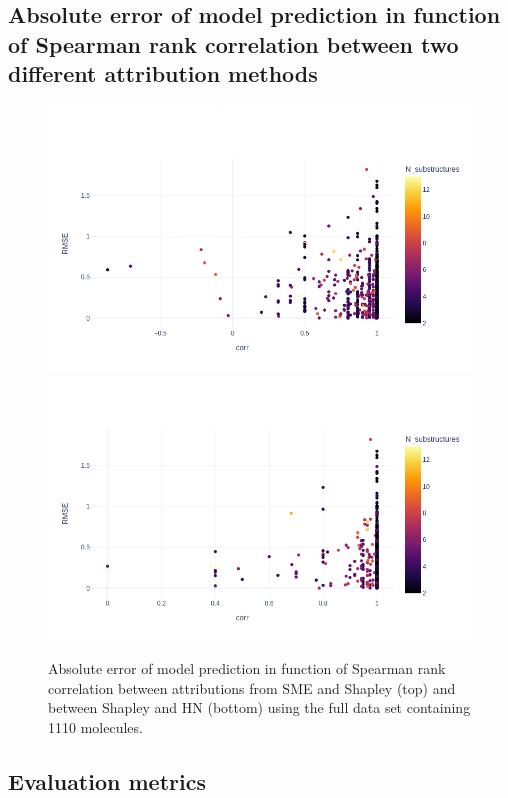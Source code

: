\documentclass[twoside,twocolumn,9pt]{article}
\begin{document}
\subsection{Absolute error of model prediction in function of Spearman rank correlation between two different attribution methods}

\begin{figure}[H]
    \centering
    \includegraphics[scale=0.35]{../data/images/esol_rank_vs_AE_SME_Shapley_combined.png}
    \includegraphics[scale=0.35]{../data/images/esol_rank_vs_AE_Shapley_HN_combined.png}
    \caption{Absolute error of model prediction in function of Spearman rank correlation between 
        attributions from SME and Shapley (top) and between Shapley and HN (bottom) using the full 
        data set containing 1110 molecules.
    }
\end{figure}



\subsection{Evaluation metrics}
\end{document}
